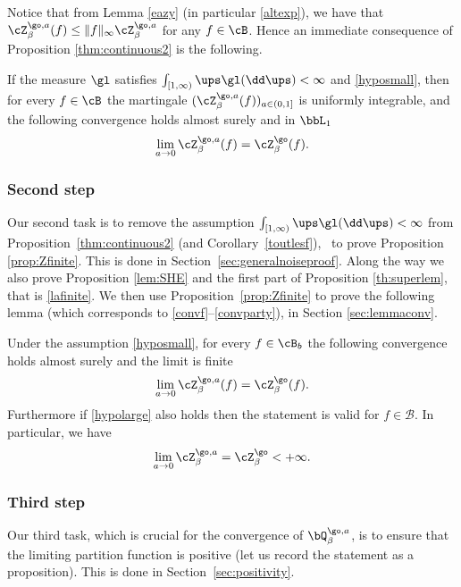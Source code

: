  Notice that from Lemma \ref{eazy} (in particular \eqref{altexp}),
we have that
$\cZ^{\go,a }_{\beta}(f)\le \|f\|_{\infty} \cZ^{\go,a }_{\beta}$ for any $f\in \cB$. Hence an immediate consequence of
Proposition \ref{thm:continuous2} is the following.

\begin{cor}\label{toutlesf}
If the measure $\gl$ satisfies $\int_{[1,\infty)} \ups \gl(\dd \ups)<\infty$ and \eqref{hyposmall}, then for every $f\in \cB$ the martingale
$(\cZ^{\go,a }_{\beta}(f))_{a\in(0,1]}$ is uniformly integrable, and
the following convergence holds almost surely and in $\bbL_1$
\begin{equation*}
\lim_{a \to 0}\cZ^{\go,a }_{\beta}(f)=\cZ^{\go }_{ \beta}(f).
\end{equation*}
\end{cor}

\subsubsection*{Second step} Our second task is to remove the assumption $\int_{[1,\infty)} \ups \gl(\dd \ups)<\infty$ from Proposition~\ref{thm:continuous2} (and Corollary~\ref{toutlesf}), \ie \ to prove Proposition \ref{prop:Zfinite}. This is done in Section~\ref{sec:generalnoiseproof}. Along the way we also prove Proposition \ref{lem:SHE} and the first part of Proposition \ref{th:superlem}, that is \eqref{lafinite}.
We then use Proposition~\ref{prop:Zfinite} to prove the following lemma (which corresponds to \eqref{convf}--\eqref{convparty}), in Section \ref{sec:lemmaconv}.

\begin{lemma}\label{lemmaconv}
Under the assumption \eqref{hyposmall}, for every $f\in \cB_b$
the following convergence holds almost surely and the limit is finite
\begin{equation*}
\lim_{a \to 0}\cZ^{\go,a }_{\beta}(f)=\cZ^{\go }_{ \beta}(f).
\end{equation*}
Furthermore if \eqref{hypolarge} also holds then the statement is valid for $f\in \mathcal B$. In particular, we have
\begin{equation}
\label{eq:lemmaconv}
\lim_{a \to 0}\cZ^{\go,a }_{\beta}=\cZ^{\go }_{ \beta} <+\infty.
\end{equation}
\end{lemma}

\subsubsection*{Third step} Our third task, which is crucial for the convergence of $\bQ^{\go,a}_{\beta}$, is to ensure that the limiting partition function is positive (let us record the statement as a proposition).
This is done in Section~\ref{sec:positivity}.

